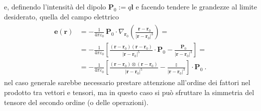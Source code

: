 \documentclass[letterpaper,10pt,italian]{jupyterBook}
\begin{document}
\sphinxAtStartPar
e, definendo l’intensità del dipolo \(\mathbf{P}_0 := q \mathbf{l}\) e facendo tendere le grandezze al limite desiderato, quella del campo elettrico
\begin{equation*}
\begin{split}\begin{aligned}
  \mathbf{e}(\mathbf{r})
  & = - \frac{1}{4\pi \varepsilon_0} \, \mathbf{P}_0 \cdot \nabla_{\mathbf{r}_0}  \left( \frac{\mathbf{r} - \mathbf{r}_0}{|\mathbf{r} - \mathbf{r}_0|^3} \right)   = \\
  & = - \frac{1}{4\pi \varepsilon_0} \left[ \frac{(\mathbf{r}-\mathbf{r}_0)(\mathbf{r}-\mathbf{r}_0)}{|\mathbf{r}-\mathbf{r}_0|^5} \cdot \mathbf{P}_0 - \frac{\mathbf{P}_0}{|\mathbf{r}-\mathbf{r}_0|^3} \right] = \\
  & = - \frac{1}{4\pi \varepsilon_0} \left[ \frac{(\mathbf{r}-\mathbf{r}_0) \otimes (\mathbf{r}-\mathbf{r}_0)}{|\mathbf{r}-\mathbf{r}_0|^5} - \frac{\mathbb{I}}{|\mathbf{r}-\mathbf{r}_0|^3} \right] \cdot \mathbf{P}_0 \ .
\end{aligned}\end{split}
\end{equation*}
\sphinxAtStartPar
{} nel caso generale sarebbe necessario prestare attenzione all’ordine dei fattori nel prodotto tra vettori e tensori, ma in questo caso si può sfruttare la simmetria del tensore del secondo ordine (o delle operazioni).
\end{document}

